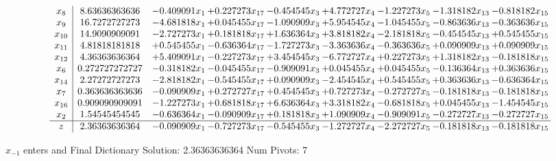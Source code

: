 \documentclass[10pt]{article}
\begin{document}
 \[\begin{array}{c| c c@{\hskip 2pt} c@{\hskip 2pt} c@{\hskip 2pt} c@{\hskip 2pt} c@{\hskip 2pt} c@{\hskip 2pt} c@{\hskip 2pt} }
 x_{8}   &  8.63636363636 & -0.409091 x_{1} & + 0.227273 x_{17} & -0.454545 x_{3} & + 4.772727 x_{4} & -1.227273 x_{5} & -1.318182 x_{13} & -0.818182 x_{15}\\
 x_{9}   &  16.7272727273 & -4.681818 x_{1} & + 0.045455 x_{17} & -1.090909 x_{3} & + 5.954545 x_{4} & -1.045455 x_{5} & -0.863636 x_{13} & -0.363636 x_{15}\\
 x_{10}   &  14.9090909091 & -2.727273 x_{1} & + 0.181818 x_{17} & + 1.636364 x_{3} & + 3.818182 x_{4} & -2.181818 x_{5} & -0.454545 x_{13} & + 0.545455 x_{15}\\
 x_{11}   &  4.81818181818 & + 0.545455 x_{1} & -0.636364 x_{17} & -1.727273 x_{3} & -3.363636 x_{4} & -0.363636 x_{5} & + 0.090909 x_{13} & + 0.090909 x_{15}\\
 x_{12}   &  4.36363636364 & + 5.409091 x_{1} & -0.227273 x_{17} & + 3.454545 x_{3} & -6.772727 x_{4} & + 0.227273 x_{5} & + 1.318182 x_{13} & -0.181818 x_{15}\\
 x_{6}   &  0.272727272727 & -0.318182 x_{1} & -0.045455 x_{17} & -0.909091 x_{3} & + 0.045455 x_{4} & + 0.045455 x_{5} & -0.136364 x_{13} & + 0.363636 x_{15}\\
 x_{14}   &  2.27272727273 & -2.818182 x_{1} & -0.545455 x_{17} & + 0.090909 x_{3} & -2.454545 x_{4} & + 0.545455 x_{5} & + 0.363636 x_{13} & -0.636364 x_{15}\\
 x_{7}   &  0.363636363636 & -0.090909 x_{1} & + 0.272727 x_{17} & + 0.454545 x_{3} & + 0.727273 x_{4} & -0.272727 x_{5} & -0.181818 x_{13} & -0.181818 x_{15}\\
 x_{16}   &  0.909090909091 & -1.227273 x_{1} & + 0.681818 x_{17} & + 6.636364 x_{3} & + 3.318182 x_{4} & -0.681818 x_{5} & + 0.045455 x_{13} & -1.454545 x_{15}\\
 x_{2}   &  1.54545454545 & -0.636364 x_{1} & -0.090909 x_{17} & + 0.181818 x_{3} & + 1.090909 x_{4} & -0.909091 x_{5} & -0.272727 x_{13} & -0.272727 x_{15}\\
\hline
z    &  2.36363636364 & -0.090909 x_{1} & -0.727273 x_{17} & -0.545455 x_{3} & -1.272727 x_{4} & -2.272727 x_{5} & -0.181818 x_{13} & -0.181818 x_{15}\\
\end{array}\]


 $ x_{-1} $ enters and Final Dictionary
Solution:  2.36363636364
Num Pivots:  7
\end{document}
